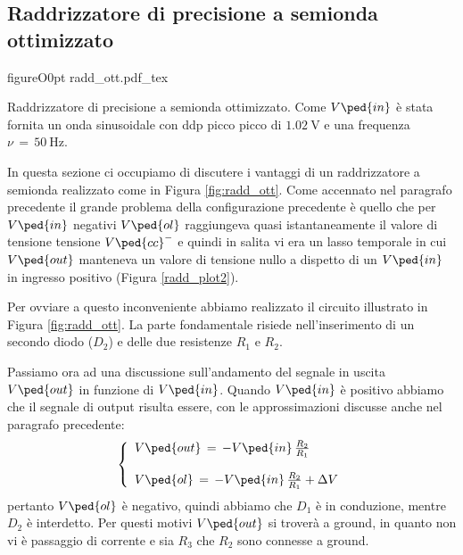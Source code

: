 \newpage

\subsection*{Raddrizzatore di precisione a semionda ottimizzato}

\begin{wrapfloat}{figure}{O}{0pt}
        \def\svgwidth{0.5\textwidth}
        {radd_ott.pdf_tex}
        \caption{Raddrizzatore di precisione a semionda ottimizzato. Come $V\ped{in}$ è stata fornita un onda sinusoidale con ddp picco picco di $\SI{1.02}{\volt}$ e una frequenza $\nu\,=\,\SI{50}{\hertz}$.}
        \label{fig:radd_ott}
\end{wrapfloat}

In questa sezione ci occupiamo di discutere i vantaggi di un raddrizzatore a semionda realizzato come in Figura \ref{fig:radd_ott}. Come accennato nel paragrafo precedente il grande problema della configurazione precedente è quello che per $V\ped{in}$ negativi $V\ped{ol}$ raggiungeva quasi istantaneamente il valore di tensione tensione $V\ped{cc}^-$ e quindi in salita vi era un lasso temporale in cui $V\ped{out}$ manteneva un valore di tensione nullo a dispetto di un $V\ped{in}$ in ingresso positivo (Figura \ref{radd_plot2}).

Per ovviare a questo inconveniente abbiamo realizzato il circuito illustrato in Figura \ref{fig:radd_ott}. La parte fondamentale risiede nell'inserimento di un secondo diodo ($D_2$) e delle due resistenze $R_1$ e $R_2$.

Passiamo ora ad una discussione sull'andamento del segnale in uscita $V\ped{out}$ in funzione di $V\ped{in}$. Quando $V\ped{in}$ è positivo abbiamo che il segnale di output risulta essere, con le approssimazioni discusse anche nel paragrafo precedente:
\begin{equation}
        \left\{
                \begin{array}{l l l}
                        V\ped{out}\,=\,-V\ped{in}\,\frac{R_2}{R_1}\\
                        \\
                        V\ped{ol}\,=\,-V\ped{in}\,\frac{R_2}{R_1} + \Delta V
                \end{array}
         \right.
         \label{eq:radd_ott}
\end{equation}
pertanto $V\ped{ol}$ è negativo, quindi abbiamo che $D_1$ è in conduzione, mentre $D_2$ è interdetto. Per questi motivi $V\ped{out}$ si troverà a ground, in quanto non vi è passaggio di corrente e sia $R_3$ che $R_2$ sono connesse a ground.

